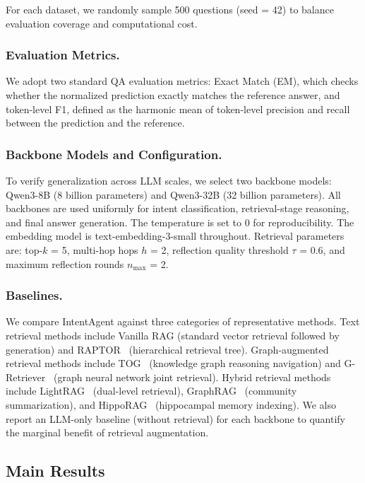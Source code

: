 \documentclass[runningheads]{llncs}
\begin{document}
For each dataset, we randomly sample 500 questions (seed = 42) to balance evaluation coverage and computational cost.

\subsubsection{Evaluation Metrics.}

We adopt two standard QA evaluation metrics: Exact Match (EM), which checks whether the normalized prediction exactly matches the reference answer, and token-level F1, defined as the harmonic mean of token-level precision and recall between the prediction and the reference.

\subsubsection{Backbone Models and Configuration.}

To verify generalization across LLM scales, we select two backbone models: Qwen3-8B (8 billion parameters) and Qwen3-32B (32 billion parameters). All backbones are used uniformly for intent classification, retrieval-stage reasoning, and final answer generation. The temperature is set to 0 for reproducibility. The embedding model is text-embedding-3-small throughout. Retrieval parameters are: top-$k$ = 5, multi-hop hops $h$ = 2, reflection quality threshold $\tau$ = 0.6, and maximum reflection rounds $n_{\max}$ = 2.

\subsubsection{Baselines.}

We compare IntentAgent against three categories of representative methods. Text retrieval methods include Vanilla RAG (standard vector retrieval followed by generation) and RAPTOR~\cite{ref23} (hierarchical retrieval tree). Graph-augmented retrieval methods include TOG~\cite{ref24} (knowledge graph reasoning navigation) and G-Retriever~\cite{ref25} (graph neural network joint retrieval). Hybrid retrieval methods include LightRAG~\cite{ref26} (dual-level retrieval), GraphRAG~\cite{ref27} (community summarization), and HippoRAG~\cite{ref28} (hippocampal memory indexing). We also report an LLM-only baseline (without retrieval) for each backbone to quantify the marginal benefit of retrieval augmentation.

\subsection{Main Results}
\end{document}
